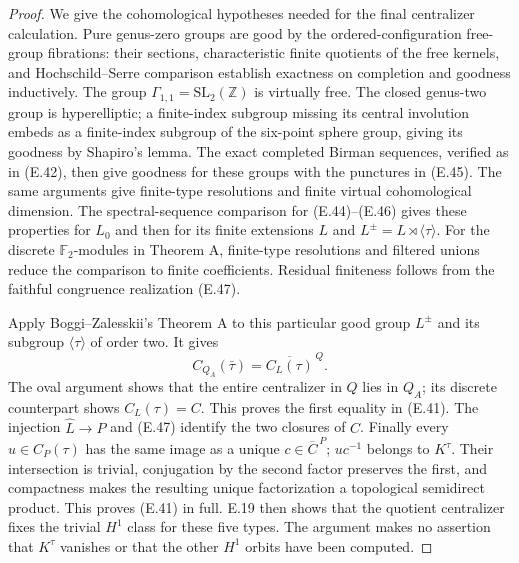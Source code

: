 \begin{proof}
We give the cohomological hypotheses needed for the final
centralizer calculation.  Pure genus-zero groups are good
by the ordered-configuration free-group fibrations: their
sections, characteristic finite quotients of the free kernels,
and Hochschild--Serre comparison establish exactness on
completion and goodness inductively.  The group
$\Gamma_{1,1}=\mathrm{SL}_2(\mathbb Z)$ is virtually free.
The closed genus-two group is hyperelliptic; a finite-index
subgroup missing its central involution embeds as a
finite-index subgroup of the six-point sphere group, giving
its goodness by Shapiro's lemma.  The exact completed Birman
sequences, verified as in (E.42), then give goodness for
these groups with the punctures in (E.45).  The same
arguments give finite-type resolutions and finite virtual
cohomological dimension.  The spectral-sequence comparison
for (E.44)--(E.46) gives these properties for $L_0$ and then
for its finite extensions $L$ and
$L^\pm=L\rtimes\langle\tau\rangle$.  For the discrete
$\mathbb F_2$-modules in Theorem A, finite-type resolutions
and filtered unions reduce the comparison to finite
coefficients.  Residual finiteness follows from the faithful
congruence realization (E.47).

Apply Boggi--Zalesskii's Theorem A to this particular good
group $L^\pm$ and its subgroup $\langle\tau\rangle$ of
order two.  It gives
\[
 C_{Q_A}(\bar\tau)=\overline{C_L(\tau)}^{\,Q}.
\]
The oval argument shows that the entire centralizer in $Q$
lies in $Q_A$; its discrete counterpart shows
$C_L(\tau)=C$.  This proves the first equality in (E.41).
The injection $\widehat L\to P$ and (E.47) identify the
two closures of $C$.  Finally every $u\in C_P(\tau)$ has
the same image as a unique $c\in\overline C^{\,P}$;
$uc^{-1}$ belongs to $K^\tau$.  Their intersection is
trivial, conjugation by the second factor preserves the
first, and compactness makes the resulting unique
factorization a topological semidirect product.  This
proves (E.41) in full.  E.19 then shows that the quotient
centralizer fixes the trivial $H^1$ class for these five
types.  The argument makes no assertion that $K^\tau$
vanishes or that the other $H^1$ orbits have been computed.
\end{proof}

